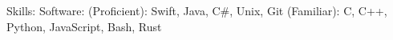 



Skills: Software: (Proficient): Swift, Java, C\#, Unix, Git (Familiar): C, C++, Python, JavaScript, Bash, Rust





